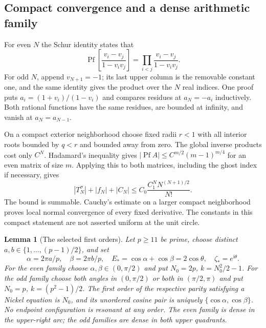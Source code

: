 \documentclass[11pt]{article}
\numberwithin{equation}{section}
\newtheorem{lemma}[theorem]{Lemma}
\theoremstyle{definition}
\newcommand{\ii}{\mathrm i}
\DeclareMathOperator{\Pf}{Pf}
\begin{document}
\subsection{Compact convergence and a dense arithmetic family}

For even $N$ the Schur identity states that
\[
 \Pf\left[\frac{v_i-v_j}{1-v_iv_j}\right]
 =\prod_{i<j}\frac{v_i-v_j}{1-v_iv_j}.
\]
For odd $N$, append $v_{N+1}=-1$; its last upper column is the removable
constant one, and the same identity gives the product over the $N$ real
indices. One proof puts $a_i=(1+v_i)/(1-v_i)$ and compares residues at
$a_N=-a_i$ inductively. Both rational functions have the same residues,
are bounded at infinity, and vanish at $a_N=a_{N-1}$.

On a compact exterior neighborhood choose fixed radii $r<1$ with all
interior roots bounded by $q<r$ and bounded away from zero. The global
inverse products cost only $C^N$. Hadamard's inequality gives
$|\Pf A|\le C^{m/2}(m-1)^{m/4}$ for an even matrix of size $m$.
Applying this to both matrices, including the ghost index if necessary,
gives
\begin{equation}
 |T_N^\sigma|+|f_N|+|C_N|
 \le C_0\frac{C_1^N N^{(N+1)/2}}{N!}.
 \label{iso:normal}
\end{equation}
The bound is summable. Cauchy's estimate on a larger compact neighborhood
proves local normal convergence of every fixed derivative. The constants
in this compact statement are not asserted uniform at the unit circle.

\begin{lemma}[The selected first orders]\label{iso:arithmetic}
Let $p\ge11$ be prime, choose distinct
$a,b\in\{1,\ldots,(p-1)/2\}$, and set
\[
 \alpha=2\pi a/p,\quad\beta=2\pi b/p,\quad
 E_*=\cos\alpha+\cos\beta=2\cos\theta,
 \quad\zeta_*=e^{\ii\theta}.
\]
For the even family choose $\alpha,\beta\in(0,\pi/2)$ and put
$N_0=2p$, $k=N_0^2/2-1$. For the odd family choose both angles in
$(0,\pi/2)$ or both in $(\pi/2,\pi)$ and put
$N_0=p$, $k=(p^2-1)/2$.
The first order of the respective parity satisfying a Nickel equation is
$N_0$, and its unordered cosine pair is uniquely
$\{\cos\alpha,\cos\beta\}$. No endpoint configuration is resonant at any
order. The even family is dense in the upper-right arc; the odd families
are dense in both upper quadrants.
\end{lemma}
\end{document}
